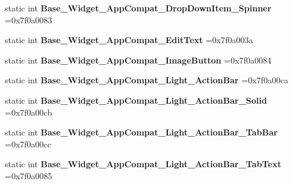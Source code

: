 \begin{DoxyCompactItemize}
\mbox{\label{classandroid_1_1support_1_1v7_1_1cardview_1_1R_1_1style_afef4fa16f54cc120783763065ce1f420}} 
static int {\bfseries Base\+\_\+\+Widget\+\_\+\+App\+Compat\+\_\+\+Drop\+Down\+Item\+\_\+\+Spinner} =0x7f0a0083
\item 
\mbox{\label{classandroid_1_1support_1_1v7_1_1cardview_1_1R_1_1style_a7e796118309d8c492aa8fff9190eea53}} 
static int {\bfseries Base\+\_\+\+Widget\+\_\+\+App\+Compat\+\_\+\+Edit\+Text} =0x7f0a003a
\item 
\mbox{\label{classandroid_1_1support_1_1v7_1_1cardview_1_1R_1_1style_a088072a6d2412be3e27c3c1c210fa783}} 
static int {\bfseries Base\+\_\+\+Widget\+\_\+\+App\+Compat\+\_\+\+Image\+Button} =0x7f0a0084
\item 
\mbox{\label{classandroid_1_1support_1_1v7_1_1cardview_1_1R_1_1style_a9cfe0b055ffddd54a5238788e57d8d90}} 
static int {\bfseries Base\+\_\+\+Widget\+\_\+\+App\+Compat\+\_\+\+Light\+\_\+\+Action\+Bar} =0x7f0a00ca
\item 
\mbox{\label{classandroid_1_1support_1_1v7_1_1cardview_1_1R_1_1style_af7deb637bf5b91bb3767c4a5a1f74293}} 
static int {\bfseries Base\+\_\+\+Widget\+\_\+\+App\+Compat\+\_\+\+Light\+\_\+\+Action\+Bar\+\_\+\+Solid} =0x7f0a00cb
\item 
\mbox{\label{classandroid_1_1support_1_1v7_1_1cardview_1_1R_1_1style_a0c62984689d87c618031f32b1a88a6c9}} 
static int {\bfseries Base\+\_\+\+Widget\+\_\+\+App\+Compat\+\_\+\+Light\+\_\+\+Action\+Bar\+\_\+\+Tab\+Bar} =0x7f0a00cc
\item 
\mbox{\label{classandroid_1_1support_1_1v7_1_1cardview_1_1R_1_1style_a5dd4b321bc420ded4c862b017aba280b}} 
static int {\bfseries Base\+\_\+\+Widget\+\_\+\+App\+Compat\+\_\+\+Light\+\_\+\+Action\+Bar\+\_\+\+Tab\+Text} =0x7f0a0085
\item 
\mbox{\label{classandroid_1_1support_1_1v7_1_1cardview_1_1R_1_1style_adb9ec502a4a23a19c70b02a1f54656bc}} 

\end{DoxyCompactItemize}
